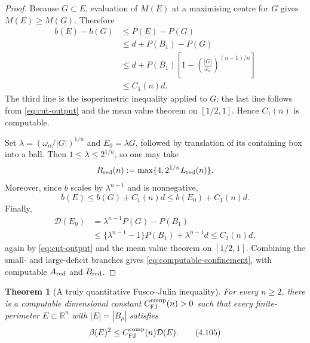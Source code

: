 \documentclass[11pt]{amsart}
\newtheorem{theorem}{Theorem}[section]
\theoremstyle{definition}
\newcommand{\R}{\mathbb R}
\newcommand{\Per}{P}
\newcommand{\Def}{\mathcal D}
\begin{document}
\begin{proof}
Because \(G\subset E\), evaluation of \(M(E)\) at a maximising centre
for \(G\) gives \(M(E)\ge M(G)\).  Therefore
\[
\begin{aligned}
   b(E)-b(G)
   &\le\Per(E)-\Per(G)\\
   &\le d+\Per(B_1)-\Per(G)\\
   &\le d+\Per(B_1)
       \left[1-\left(\frac{|G|}{\omega_n}\right)^{(n-1)/n}\right]\\
   &\le C_1(n)d.
\end{aligned}
\tag{4.103}\label{eq:beta-cut-control}
\]
The third line is the isoperimetric inequality applied to \(G\); the
last line follows from \eqref{eq:cut-output} and the mean value theorem
on \([1/2,1]\).  Hence \(C_1(n)\) is computable.

Set \(\lambda=(\omega_n/|G|)^{1/n}\) and
\(E_0=\lambda G\), followed by translation of its containing box into
a ball.  Then \(1\le\lambda\le2^{1/n}\), so one may take
\[
   R_{\rm red}(n):=\max\{4,2^{1/n}L_{\rm red}(n)\}.
\]
Moreover, since \(b\) scales by \(\lambda^{n-1}\) and is nonnegative,
\[
   b(E)\le b(G)+C_1(n)d\le b(E_0)+C_1(n)d.
\]
Finally,
\[
\begin{aligned}
   \Def(E_0)
   &=\lambda^{n-1}\Per(G)-\Per(B_1)\\
   &\le\{\lambda^{n-1}-1\}\Per(B_1)+\lambda^{n-1}d
    \le C_2(n)d,
\end{aligned}
\tag{4.104}\label{eq:def-cut-control}
\]
again by \eqref{eq:cut-output} and the mean value theorem on
\([1/2,1]\).  Combining the small- and large-deficit branches gives
\eqref{eq:computable-confinement}, with computable
\(A_{\rm red}\) and \(B_{\rm red}\).
\end{proof}

\begin{theorem}[A truly quantitative Fusco--Julin inequality]
\label{thm:global-computable-FJ}
For every \(n\ge2\), there is a computable dimensional constant
\(C_{\rm FJ}^{\rm comp}(n)>0\) such that every finite-perimeter
\(E\subset\R^n\) with \(|E|=|B_\rho|\) satisfies
\[
   \beta(E)^2\le C_{\rm FJ}^{\rm comp}(n)\Def(E).
\tag{4.105}\label{eq:global-computable-FJ}
\]
\end{theorem}
\end{document}
